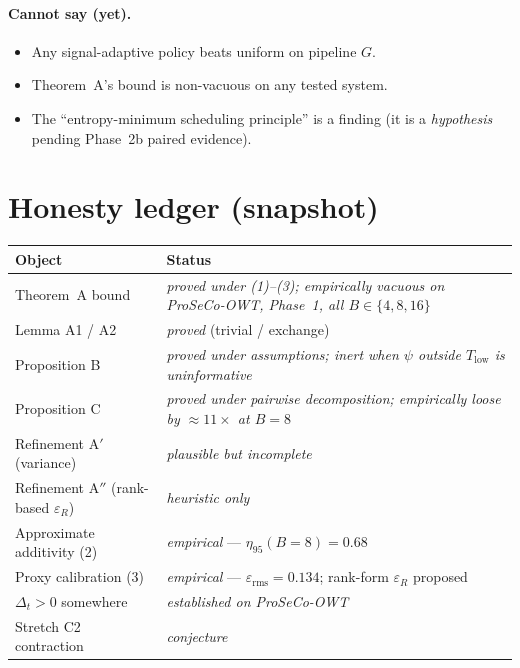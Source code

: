 \documentclass[11pt,a4paper]{article}
\newcommand{\eps}{\varepsilon}
\begin{document}
\paragraph{Cannot say (yet).}
\begin{itemize}[leftmargin=1.4em, itemsep=0pt]
  \item Any signal-adaptive policy beats uniform on pipeline $G$.
  \item Theorem~A's bound is non-vacuous on any tested system.
  \item The ``entropy-minimum scheduling principle'' is a finding (it is a
    \emph{hypothesis} pending Phase~2b paired evidence).
\end{itemize}

\section{Honesty ledger (snapshot)}

\begin{center}
\renewcommand{\arraystretch}{1.15}
\begin{tabular}{lp{8.5cm}}
\toprule
Object & Status \\
\midrule
Theorem~A bound & \emph{proved under (1)--(3); empirically vacuous on
  ProSeCo-OWT, Phase~1, all $B\in\{4,8,16\}$}\\
Lemma A1 / A2 & \emph{proved} (trivial / exchange) \\
Proposition B & \emph{proved under assumptions; inert when $\psi$ outside
  $T_{\mathrm{low}}$ is uninformative} \\
Proposition C & \emph{proved under pairwise decomposition; empirically loose
  by ${\approx}11{\times}$ at $B{=}8$} \\
Refinement A$'$ (variance) & \emph{plausible but incomplete} \\
Refinement A$''$ (rank-based $\eps_R$) & \emph{heuristic only} \\
Approximate additivity (2) & \emph{empirical} --- $\eta_{95}(B{=}8){=}0.68$ \\
Proxy calibration (3) & \emph{empirical} --- $\eps_{\mathrm{rms}}{=}0.134$;
  rank-form $\eps_R$ proposed \\
$\Delta_t > 0$ somewhere & \emph{established on ProSeCo-OWT} \\
Stretch C2 contraction & \emph{conjecture} \\
\bottomrule
\end{tabular}
\end{center}
\end{document}
